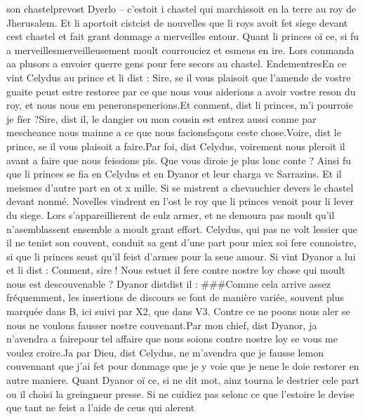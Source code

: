 \documentclass{article}
\begin{document}
\begin{pages}
   son chastelprevost Dyerlo 
   – c’estoit i chastel qui marchissoit en la terre au
   roy de Jherusalem. 
   Et li aportoit cistcist de nouvelles que 
   li roys avoit fet siege devant 
   cest chastel et fait grant donmage 
   a merveilles entour. Quant li princes oï ce, si fu 
   a merveillesmerveilleusement moult courrouciez et esmeus en ire. 
   Lors conmanda aa plusors a envoier querre gens pour fere secors au 
   chastel. EndementresEn ce vint 
   Celydus au prince et li dist :
   Sire, se il vous plaisoit que l’amende de vostre guaite 
   peust estre restoree par ce que nous vous aiderions a avoir vostre reson du roy, 
      et nous nous em peneronspenerions.Et conment, dist li princes, m’i pourroie je fïer ?Sire, dist il, le dangier ou mon cousin est entrez aussi conme 
      par mescheance nous mainne a ce que nous facionsfaçons ceste chose.Voire, dist le prince, se il vous plaisoit 
      a faire.Par foi, dist Celydus, 
      voirement nous pleroit il avant a faire que nous feissions pis.
   Que vous diroie je plus 
      lonc conte ? 
   Ainsi fu que li princes se fia en Celydus et en 
   Dyanor et leur charga vc Sarrazins. 
   Et il meismes d’autre part en ot x mille. 
   Si se mistrent a chevauchier devers le chastel devant nonmé. 
   Novelles vindrent en l’ost le roy que li princes 
   venoit pour li lever du siege. Lors s’appareillierent de eulz armer, et ne demoura pas moult qu’il n’asemblassent ensemble 
   a moult grant effort. \pend
\pstart Celydus, qui pas ne volt lessier que il ne tenist son couvent, 
   conduit sa gent d’une part pour miex soi fere connoistre, si que li princes seust 
   qu’il feist d’armes pour la seue amour. Si vint Dyanor a lui et li dist :
   Conment, sire ! Nous estuet il fere contre 
      nostre loy chose qui moult nous est descouvenable ?
   Dyanor distdist il :
   ###Comme cela arrive assez fréquemment, les insertions de discours se font de manière variée,
      souvent plus marquée dans B, ici suivi par X2, que dans V3.
   Contre ce ne poons nous aler se nous ne voulons fausser nostre couvenant.Par mon chief, dist Dyanor, ja n’avendra 
      a fairepour tel affaire que 
      nous soions contre nostre 
      loy se vous me voulez croire.Ja par Dieu, dist Celydus, ne m’avendra que je fausse 
      lemon couvennant 
      que j’ai fet pour donmage que je y voie que je 
      nene le doie restorer en autre maniere.
   Quant Dyanor oï ce, si ne dit mot, ainz tourna le destrier cele part ou il choisi la greingneur 
   presse. Si ne cuidiez pas selonc ce que l’estoire le devise que tant ne feist a l’aide de ceus qui alerent 

\end{pages}
\end{document}
